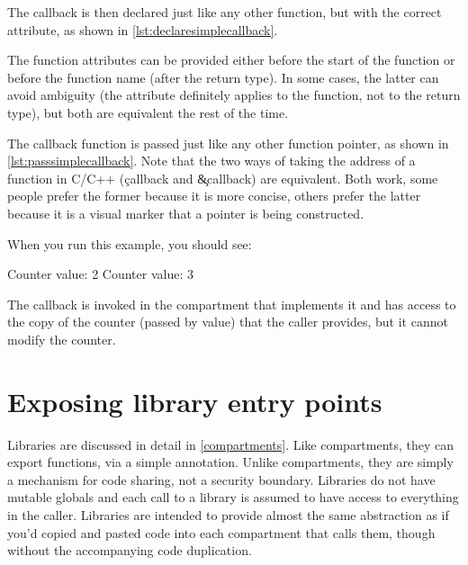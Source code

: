 {{The callback is then declared just like any other function, but with the correct attribute, as shown in \ref{lst:declaresimplecallback}.

\begin{note}
	The function attributes can be provided either before the start of the function or before the function name (after the return type).
	In some cases, the latter can avoid ambiguity (the attribute definitely applies to the function, not to the return type), but both are equivalent the rest of the time.
\end{note}

\codelisting[filename=examples/compartment_annotation/entry.cc,marker=callback,label=lst:declaresimplecallback,caption="A function that can be invoked as a cross-compartment callback."]{}

The callback function is passed just like any other function pointer, as shown in \ref{lst:passsimplecallback}.
Note that the two ways of taking the address of a function in C/C++ (\c{callback} and \c{&callback}) are equivalent.
Both work, some people prefer the former because it is more concise, others prefer the latter because it is a visual marker that a pointer is being constructed.

\codelisting[filename=examples/compartment_annotation/entry.cc,marker=compartment_call,label=lst:passsimplecallback,caption="A function that can be invoked as a cross-compartment callback."]{}

When you run this example, you should see:

\begin{console}
Counter value: 2
Counter value: 3
\end{console}

The callback is invoked in the compartment that implements it and has access to the copy of the counter (passed by value) that the caller provides, but it cannot modify the counter.

\section{Exposing library entry points}

Libraries are discussed in detail in \ref{compartments}.
Like compartments, they can export functions, via a simple annotation.
Unlike compartments, they are simply a mechanism for code sharing, not a security boundary.
Libraries do not have mutable globals and each call to a library is assumed to have access to everything in the caller.
Libraries are intended to provide almost the same abstraction as if you'd copied and pasted code into each compartment that calls them, though without the accompanying code duplication.

}}
